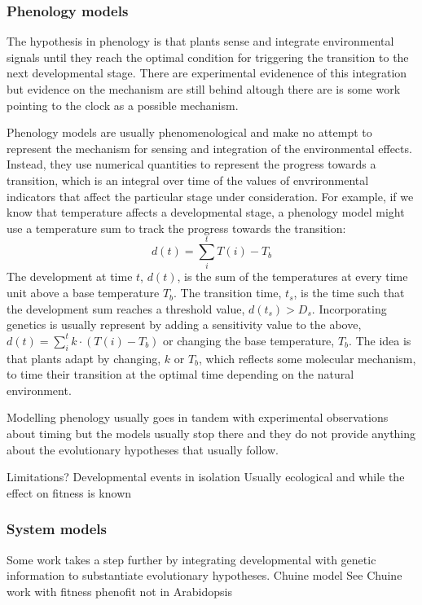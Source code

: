 \documentclass[phd]{infthesis}
\newcommand{\todo}[1]{\mrcolor{red}{TODO: #1}}
\begin{document}
\subsubsection*{Phenology models}
The hypothesis in phenology is that plants sense and integrate environmental
signals until they reach the optimal condition for triggering the transition to
the next developmental stage. There are experimental evidenence of this
integration but evidence on the mechanism are still behind altough there are is
some work pointing to the clock as a possible mechanism.

Phenology models are usually phenomenological and make no attempt to represent
the mechanism for sensing and integration of the environmental effects. Instead,
they use numerical quantities to represent the progress towards a transition,
which is an integral over time of the values of envrironmental indicators that
affect the particular stage under consideration. For example, if we know that
temperature affects a developmental stage, a phenology model might use a
temperature sum to track the progress towards the transition:
$$
d(t) = \sum_{i}^{t} T(i) - T_b
$$
The development at time $t$, $d(t)$, is the sum of the temperatures at every
time unit above a base temperature $T_b$. The transition time, $t_s$, is the
time such that the development sum reaches a threshold value, $d(t_s) >
D_s$. Incorporating genetics is usually represent by adding a sensitivity value
to the above, $ d(t) = \sum_{i}^{t} k \cdot (T(i) - T_b)$ or changing the base temperature,
$T_b$. The idea is that plants adapt by changing, $k$ or $T_b$, which reflects
some molecular mechanism, to time their transition at the optimal time depending
on the natural environment.

Modelling phenology usually goes in tandem with experimental observations about
timing but the models usually stop there and they do not provide anything about
the evolutionary hypotheses that usually follow.

Limitations?
Developmental events in isolation
Usually ecological and while the effect on fitness is known

\subsubsection*{System models}
Some work takes a step further by integrating developmental with genetic
information to substantiate evolutionary hypotheses. Chuine model
See Chuine work with fitness phenofit not in Arabidopsis
\end{document}
